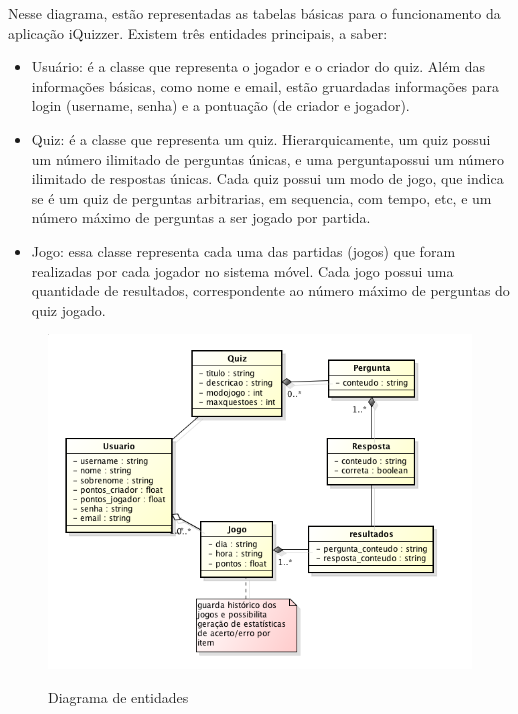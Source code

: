         Nesse diagrama, estão representadas as tabelas básicas para o funcionamento da aplicação iQuizzer. Existem três entidades principais, a saber:
\begin{itemize}
\item Usuário: é a classe que representa o jogador e o criador do quiz. Além das informações básicas, como nome e email, estão gruardadas informações para login (username, senha) e a pontuação (de criador e jogador).
\item Quiz: é a classe que representa um quiz. Hierarquicamente, um quiz possui um número ilimitado de perguntas únicas, e uma perguntapossui um número ilimitado de respostas únicas. Cada quiz possui um modo de jogo, que indica se é um quiz de perguntas arbitrarias, em sequencia, com tempo, etc, e um número máximo de perguntas a ser jogado por partida.
\item Jogo: essa classe representa cada uma das partidas (jogos) que foram realizadas por cada jogador no sistema móvel. Cada jogo possui uma quantidade de resultados, correspondente ao número máximo de perguntas do quiz jogado.
\end{itemize} 
 
\begin{figure}[H]
  \centering
  \includegraphics[scale =0.7]{figs/MER_web.png}\\
  \caption{ Diagrama de entidades }
  \label{FIG:Form_Factor2}
\end{figure}
